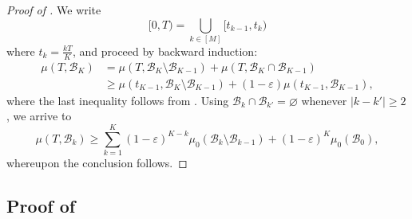 \documentclass[a4paper,11pt]{article}
\theoremstyle{plain}
\renewcommand{\geq}{\geqslant}
\numberwithin{equation}{section}
\begin{document}
\begin{proof}[Proof of ]
We write 
\begin{equation*}
[0,T)=\bigcup_{k\in[M]} [t_{k-1},t_k)
\end{equation*}
where $t_k=\frac{kT}{K}$, and proceed by backward induction:
\begin{align*}
    \mu(T,\mathscr{B}_K)&=\mu(T,\mathscr{B}_K\setminus\mathscr{B}_{K-1})+\mu(T,\mathscr{B}_K\cap \mathscr{B}_{K-1})\\
&\geq \mu(t_{K-1},\mathscr{B}_K\setminus\mathscr{B}_{K-1})+(1-\varepsilon)\mu(t_{K-1},\mathscr{B}_{K-1}),
\end{align*}
where the last inequality follows from . Using $\mathscr{B}_k\cap\mathscr{B}_{k'}=\varnothing$ whenever $|k-k'|\geq 2$, we arrive to
\begin{equation*}
    \mu(T,\mathscr{B}_k)\geq \sum_{k=1}^K (1-\varepsilon)^{K-k}\mu_0(\mathscr{B}_k\setminus\mathscr{B}_{k-1})+(1-\varepsilon)^{K}\mu_0(\mathscr{B}_0),
\end{equation*}
whereupon the conclusion follows.


\end{proof}



\subsection{\texorpdfstring{Proof of }{Proof of Lemma}}
\label{proof: induction.barycenter}
\end{document}
